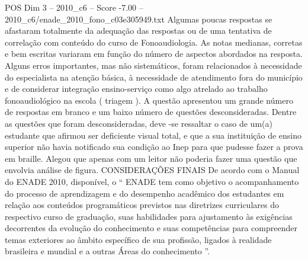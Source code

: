 \begin{textsample}{POS Dim 3 – 2010\_c6 – Score -7.00 – 2010\_c6/enade\_2010\_fono\_c03e305949.txt}
Algumas poucas respostas se afastaram totalmente da adequação das respostas ou de uma tentativa de correlação com conteúdo do curso de Fonoaudiologia.
As notas medianas, corretas e bem escritas variaram em função do número de aspectos abordados na resposta.
Alguns erros importantes, mas não sistemáticos, foram relacionados à necessidade do especialista na atenção básica, à necessidade de atendimento fora do município e de considerar integração ensino-serviço como algo atrelado ao trabalho fonoaudiológico na escola ( triagem ).
A questão apresentou um grande número de respostas em branco e um baixo número de questões desconsideradas.
Dentre as questões que foram desconsideradas, deve -se ressaltar o caso de um(a) estudante que afirmou ser deficiente visual total, e que a sua instituição de ensino superior não havia notificado sua condição ao Inep para que pudesse fazer a prova em braille.
Alegou que apenas com um leitor não poderia fazer uma questão que envolvia análise de figura.
CONSIDERAÇÕES FINAIS De acordo com o Manual do ENADE 2010, disponível, o “ ENADE tem como objetivo o acompanhamento do processo de aprendizagem e do desempenho acadêmico dos estudantes em relação aos conteúdos programáticos previstos nas diretrizes curriculares do respectivo curso de graduação, suas habilidades para ajustamento às exigências decorrentes da evolução do conhecimento e suas competências para compreender temas exteriores ao âmbito específico de sua profissão, ligados à realidade brasileira e mundial e a outras Áreas do conhecimento ”.

\end{textsample}
